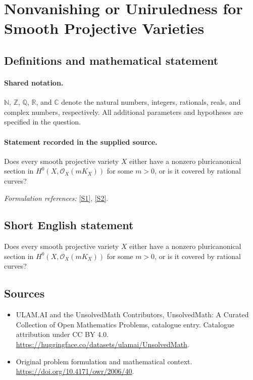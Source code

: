 \documentclass[11pt]{article}
\newcommand{\sref}[2]{\hyperlink{source:#1:#2}{[S#2]}}
\begin{document}
\section{Nonvanishing or Uniruledness for Smooth Projective Varieties}\label{statement}

\subsection{Definitions and mathematical statement}

\paragraph{Shared notation.}$\mathbb N$, $\mathbb Z$, $\mathbb Q$, $\mathbb R$, and $\mathbb C$ denote the natural numbers, integers, rationals, reals, and complex numbers, respectively. All additional parameters and hypotheses are specified in the question.


\paragraph{Statement recorded in the supplied source.}
Does every smooth projective variety $X$ either have a nonzero pluricanonical section in $H^0(X,\mathcal O_X(mK_X))$ for some $m>0$, or is it covered by rational curves?
\par\smallskip\textit{Formulation references:} \sref{statement}{1}, \sref{statement}{2}.
\subsection{Short English statement}
Does every smooth projective variety $X$ either have a nonzero pluricanonical section in $H^0(X,\mathcal O_X(mK_X))$ for some $m>0$, or is it covered by rational curves?
\subsection{Sources}
\begin{itemize}
\item[\hypertarget{source:statement:1}{S1}] ULAM.AI and the UnsolvedMath Contributors, UnsolvedMath: A Curated Collection of Open Mathematics Problems, catalogue entry. Catalogue attribution under CC BY 4.0.
\url{https://huggingface.co/datasets/ulamai/UnsolvedMath}.
\item[\hypertarget{source:statement:2}{S2}] Original problem formulation and mathematical context.
\url{https://doi.org/10.4171/owr/2006/40}.
\end{itemize}
\label{end:statement}
\end{document}
